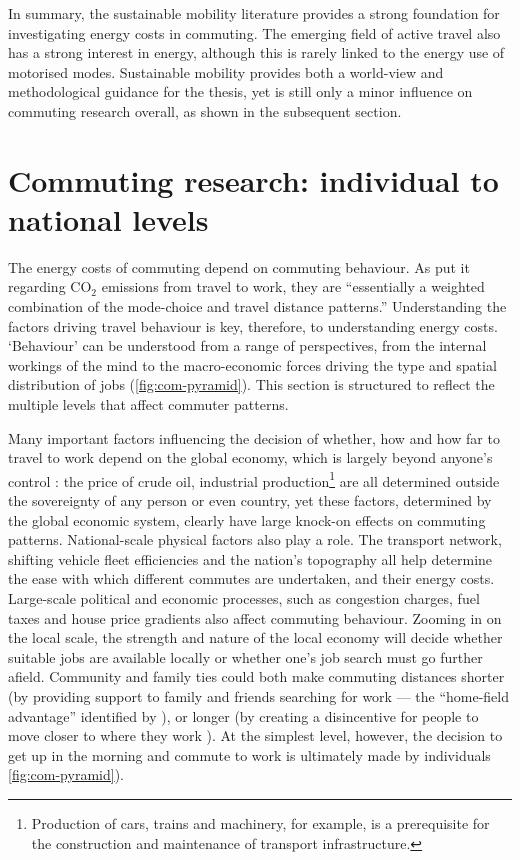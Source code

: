 In summary, the sustainable mobility literature provides a strong foundation
for investigating energy costs in commuting. The emerging field of
active travel also has a strong interest in energy, although this is rarely
linked to the energy use of motorised modes. Sustainable mobility provides both
a world-view and methodological guidance for the thesis, yet is still only a
minor influence on commuting research overall, as shown in the subsequent section.

\section{Commuting research: individual to national levels} %
\label{s:commuting}
The energy costs of commuting depend on commuting behaviour.
As \citet[p.~297]{smith2011polycentricity}
put it regarding CO$_2$ emissions from travel to work, they are
``essentially a weighted combination of the mode-choice and travel distance
patterns.'' Understanding
the factors driving travel behaviour is key, therefore, to understanding
energy costs. `Behaviour' can be understood from a range of
perspectives, from the internal workings of the mind to the macro-economic
forces driving the type and spatial distribution of jobs
(\cref{fig:com-pyramid}). This section is structured to
reflect the multiple levels that affect commuter patterns.

Many important factors influencing the decision of whether, how and
how far to travel to work depend on the global economy, which is
largely beyond anyone's control \citep{Eisenstein2011}:
the price of crude oil, industrial
production\footnote{Production of
cars, trains and machinery, for example, is a prerequisite
for the construction and maintenance of transport infrastructure.
}
are all determined outside the sovereignty of any person or even
country, yet these factors, determined by the global economic system,
clearly have large knock-on effects on commuting patterns. National-scale
physical factors also play a role.
The transport network, shifting vehicle fleet efficiencies and the nation's
topography all help determine the ease with which
different commutes are undertaken, and their energy costs.
Large-scale political and
economic processes, such as congestion charges, fuel taxes
and house price gradients also affect commuting behaviour.
Zooming in on the local scale, the strength and nature of the local
economy will decide whether suitable jobs are available locally or
whether one's job search must go further afield.
Community and family ties could both make commuting distances shorter
(by providing support to family and friends searching for work --- the
``home-field advantage'' identified by \citealt[p.~100]{Simini2012}), or longer
(by creating a disincentive for people to move closer to where they
work \citealp{Green-1999-ld-commute}).
At the simplest level, however, the decision to get up in the morning
and commute to work is ultimately made by individuals \cref{fig:com-pyramid}).

